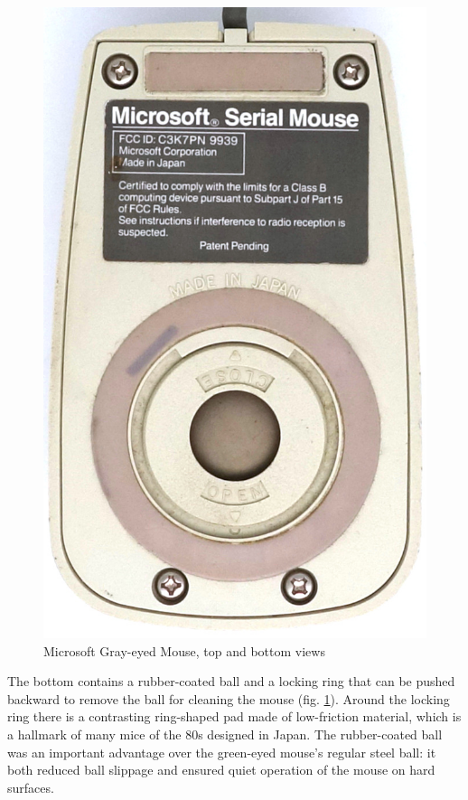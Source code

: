 \documentclass[11pt, a4paper]{article}
\begin{document}
\begin{figure}[h]
    \includegraphics[scale=0.6]{1985_microsoft_gray_eyed_mouse/bottom_30.jpg}
    \caption{Microsoft Gray-eyed Mouse, top and bottom views}
    \label{fig:MicrosoftGrayEyedTopAndBottom}
\end{figure}

The bottom contains a rubber-coated ball and a locking ring that can be pushed backward to remove the ball for cleaning the mouse (fig. \ref{fig:MicrosoftGrayEyedTopAndBottom}). Around the locking ring there is a contrasting ring-shaped pad made of low-friction material, which is a hallmark of many mice of the 80s designed in Japan. The rubber-coated ball was an important advantage over the green-eyed mouse's regular steel ball: it both reduced ball slippage and ensured quiet operation of the mouse on hard surfaces.
\end{document}

